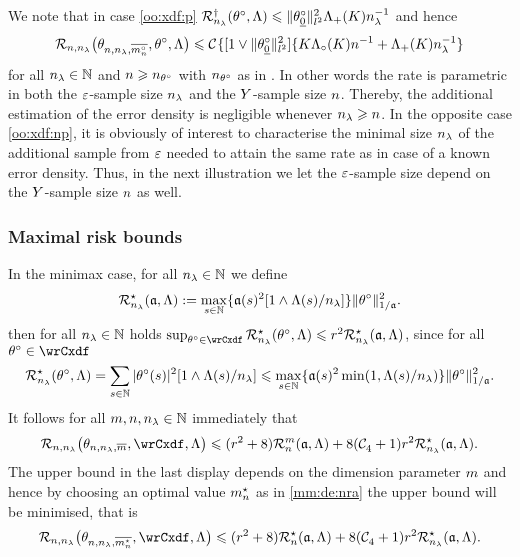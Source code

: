 \begin{rmk}
We note that in case \ref{oo:xdf:p}
$\mRa{\xdf,\Lambda}\leq
\Vnormlp{\xdf_{\underline{0}}}^2\miSv[K]\ssE^{-1}$
and hence
\begin{equation}
 \nmRi{\hxdfPr[\oDi{\ssY}]}{\xdf,\Lambda}
 \leq
\cst{}\{[1\vee\Vnormlp{\xdf_{\underline{0}}}^2]\{
K\oiSv[K]\ssY^{-1}+\miSv[K]\ssE^{-1}\}
\end{equation}
for all $\ssE\in\Nz$ and $\ssY\geq\ssY_{\xdf}$ with $\ssY_{\xdf}$ as in . In other words the
rate is parametric in both the $\rE$-sample size $\ssE$ and the $\rY$-sample size $\ssY$. Thereby, the  additional estimation of the error
density is negligible whenever $\ssE\geq\ssY$.  In the
opposite case \ref{oo:xdf:np}, it is obviously of interest to characterise the minimal size $\ssE$ of the additional
sample from $\rE$ needed to attain the same rate as in case of a known
error density. Thus, in the next illustration we let the $\rE$-sample size 
depend on the $\rY$-sample size $\ssY$ as well. 
\remEnd
\end{rmk}

\subsubsection{Maximal risk bounds}
In the minimax case, for all $\ssE\in\Nz$ we define
\begin{equation}
  \mmRa{\xdfCw[],\Lambda}:=\max_{s\in\Nz}\{\xdfCw[(s)]^2[1\wedge \iSv[s]/\ssE]\}\Vnorm[1/{\xdfCw[]}]{\xdf}^2.
\end{equation}
then for all $\ssE\in\Nz$ holds
$\sup_{\xdf\in\rwCxdf}\mmRa{\xdf,\Lambda}\leq
\xdfCr^2\mmRa{\xdfCw[],\Lambda}$, since for all
$\xdf\in\rwCxdf$ 
\begin{equation}
  \mmRa{\xdf,\Lambda}=\sum_{s\in\Nz} \vert \fxdf[(s)] \vert ^2[1\wedge \iSv[s]/\ssE]\leq
\max_{s\in\Nz}\{\xdfCw[(s)]^2\min(1,\iSv[s]/\ssE)\}\Vnorm[1/{\xdfCw[]}]{\xdf}^2.
\end{equation}
It follows for all $\Di,\ssY,\ssE\in\Nz$ immediately that 
\begin{equation}
  \nmRi{\hxdfPr}{\rwCxdf,\Lambda}
  \leq (\xdfCr^2+8) \dRa{\Di}{\xdfCw[],\Lambda}+8(\cst{4}+1)\xdfCr^2\mmRa{\xdfCw[],\Lambda}.
\end{equation}
The upper bound in the last display depends on the dimension parameter
$\Di$ and hence by choosing an optimal value $\mnDi$ as in
\eqref{mm:de:nra} the upper bound
will be minimised, that is
\begin{equation}
  \nmRi{\hxdfPr[\mnDi]}{\rwCxdf,\Lambda}
  \leq (\xdfCr^2+8) \mnRa{\xdfCw[],\Lambda}+8(\cst{4}+1)\xdfCr^2\mmRa{\xdfCw[],\Lambda}.
\end{equation}

